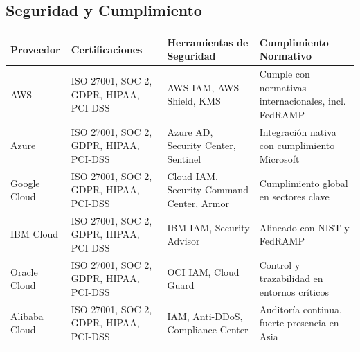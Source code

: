 {\begin{landscape}
            \subsection{Seguridad y Cumplimiento}
                \begin{tabularx}{\linewidth}{|X|X|X|X|}
                    \hline
                    \textbf{Proveedor} & \textbf{Certificaciones} & \textbf{Herramientas de Seguridad} & \textbf{Cumplimiento Normativo} \\
                    \hline
                    AWS & ISO 27001, SOC 2, GDPR, HIPAA, PCI-DSS & AWS IAM, AWS Shield, KMS & Cumple con normativas internacionales, incl. FedRAMP \\
                    \hline
                    Azure & ISO 27001, SOC 2, GDPR, HIPAA, PCI-DSS & Azure AD, Security Center, Sentinel & Integración nativa con cumplimiento Microsoft \\
                    \hline
                    Google Cloud & ISO 27001, SOC 2, GDPR, HIPAA, PCI-DSS & Cloud IAM, Security Command Center, Armor & Cumplimiento global en sectores clave \\
                    \hline
                    IBM Cloud & ISO 27001, SOC 2, GDPR, HIPAA, PCI-DSS & IBM IAM, Security Advisor & Alineado con NIST y FedRAMP \\
                    \hline
                    Oracle Cloud & ISO 27001, SOC 2, GDPR, HIPAA, PCI-DSS & OCI IAM, Cloud Guard & Control y trazabilidad en entornos críticos \\
                    \hline
                    Alibaba Cloud & ISO 27001, SOC 2, GDPR, HIPAA, PCI-DSS & IAM, Anti-DDoS, Compliance Center & Auditoría continua, fuerte presencia en Asia \\
                    \hline
                \end{tabularx}
        \end{landscape}

        \begin{landscape}

\end{landscape}}
